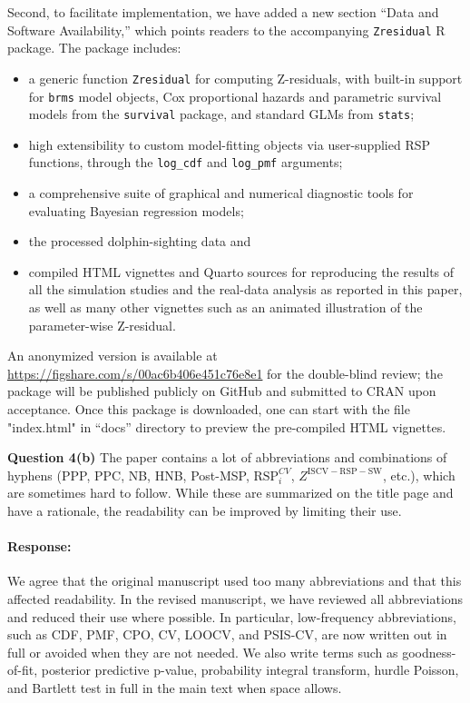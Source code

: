 \documentclass[11pt]{article}
\newcommand*{\mybox}[2]{%
  \par\medskip\noindent
  \colorbox{#1!30}{\parbox{.98\linewidth}{#2}}%
  \par\medskip
}
\begin{document}
Second, to facilitate implementation, we have added a new section ``Data and
Software Availability,'' which points readers to the accompanying
\texttt{Zresidual} R package. The package includes:
\begin{itemize}
\item a generic function \texttt{Zresidual} for computing Z-residuals, with
built-in support for \texttt{brms} model objects, Cox proportional hazards
and parametric survival models from the \texttt{survival} package, and
standard GLMs from \texttt{stats};
\item high extensibility to custom model-fitting objects via user-supplied
RSP functions, through the \texttt{log\_cdf} and \texttt{log\_pmf}
arguments;
\item a comprehensive suite of graphical and numerical diagnostic tools for
evaluating Bayesian regression models;
\item the processed dolphin-sighting data and 
\item compiled HTML vignettes and Quarto sources
for reproducing the results of all the simulation studies and the
real-data analysis as reported in this paper, as well as many other vignettes such as an animated illustration of the parameter-wise Z-residual.
\end{itemize}
An anonymized version is available at
\url{https://figshare.com/s/00ac6b406e451c76e8e1} for the double-blind
review; the package will be published publicly on GitHub and submitted to
CRAN upon acceptance. Once this package is downloaded, one can start with the file "index.html" in ``docs'' directory to preview the pre-compiled HTML vignettes. 

\medskip

\mybox{gray}{\textbf{Question 4(b)} The paper contains a lot of abbreviations and combinations of hyphens (PPP, PPC, NB, HNB, Post-MSP, $\mathrm{RSP}_i^{CV}$, $Z^{\mathrm{ISCV-RSP-SW}}$, etc.), which are sometimes hard to follow. While these are summarized on the title page and have a rationale, the readability can be improved by limiting their use.}

\paragraph{Response:}
We agree that the original manuscript used too many abbreviations and that this affected readability. In the revised manuscript, we have reviewed all abbreviations and reduced their use where possible. In particular, low-frequency abbreviations, such as CDF, PMF, CPO, CV, LOOCV, and PSIS-CV, are now written out in full or avoided when they are not needed. We also write terms such as goodness-of-fit, posterior predictive p-value, probability integral transform, hurdle Poisson, and Bartlett test in full in the main text when space allows.
\end{document}
